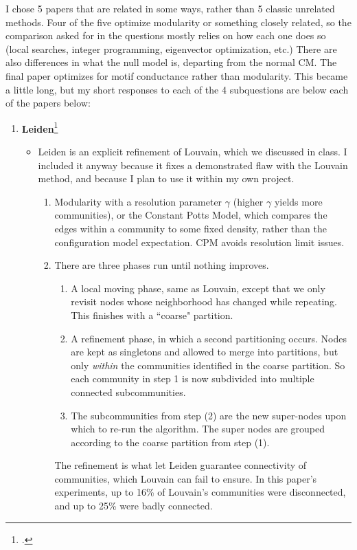 \documentclass{article}
\newcommand{\nc}[1]{(#1)}
\begin{document}
I chose 5 papers that are related in some ways, rather than 5 classic unrelated methods. Four of the five optimize modularity or something closely related, so the comparison asked for in the questions mostly relies on how each one does so (local searches, integer programming, eigenvector optimization, etc.) There are also differences in what the null model is, departing from the normal CM. The final paper optimizes for motif conductance rather than modularity. This became a little long, but my short responses to each of the 4 subquestions are below each of the papers below:
\begin{enumerate}
    \item \textbf{Leiden}\footcite{traag2019leiden}
    \begin{itemize}
        \item Leiden is an explicit refinement of Louvain, which we discussed in class. I included it anyway because it fixes a demonstrated flaw with the Louvain method, and because I plan to use it within my own project. 
        \begin{enumerate}
            \item Modularity with a resolution parameter $\gamma$ (higher $\gamma$ yields more communities), or the Constant Potts Model, which compares the edges within a community to some fixed density, rather than the configuration model expectation. CPM avoids resolution limit issues. 
            \item There are three phases run until nothing improves. 
            \begin{enumerate}
                \item[\nc 1] A local moving phase, same as Louvain, except that we only revisit nodes whose neighborhood has changed while repeating. This finishes with a ``coarse" partition.
                \item [\nc 2] A refinement phase, in which a second partitioning occurs. Nodes are kept as singletons and allowed to merge into partitions, but only \textit{within} the communities identified in the coarse partition. So each community in step 1 is now subdivided into multiple connected subcommunities. 
                \item [\nc 3] The subcommunities from step (2) are the new super-nodes upon which to re-run the algorithm. The super nodes are grouped according to the coarse partition from step (1). 
            \end{enumerate}
            The refinement is what let Leiden guarantee connectivity of communities, which Louvain can fail to ensure. In this paper's experiments, up to 16\% of Louvain's communities were disconnected, and up to 25\% were badly connected.

\end{enumerate}
\end{itemize}
\end{enumerate}
\end{document}
